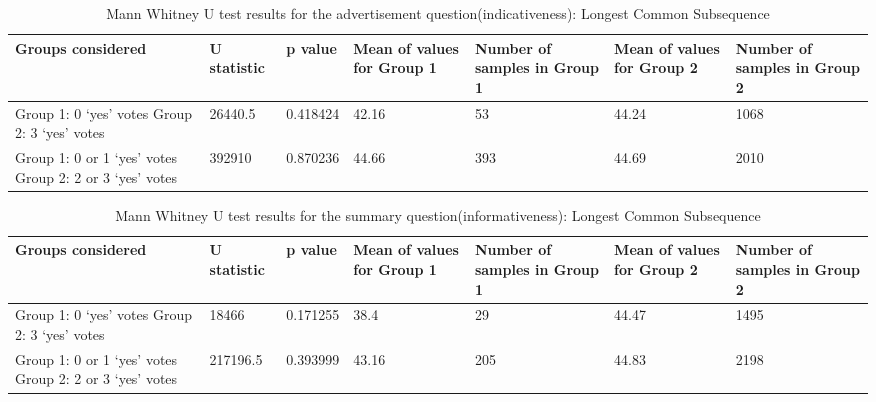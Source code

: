 \begin{table}[!htbp]
\centering
\begin{tabular}{|p{}|p{}|p{}|p{}|p{}|p{}|p{}|}
\hline
\textbf{Groups considered}    & \textbf{U statistic} & \textbf{p value} & \textbf{Mean of values for Group 1} & \textbf{Number of samples in Group 1} & \textbf{Mean of values for Group 2} & \textbf{Number of samples in Group 2}\\ \hline
Group 1: 0 `yes' votes \newline Group 2: 3 `yes' votes &  26440.5  &  0.418424  &  42.16  & 53 &  44.24 &   1068  \\ \hline
Group 1: 0 or 1 `yes' votes \newline Group 2: 2 or 3 `yes' votes  &  392910     & 0.870236 &  44.66  & 393 & 44.69 & 2010 \\ \hline
\end{tabular}
\caption{Mann Whitney U test results for the advertisement question(indicativeness): Longest Common Subsequence}
\label{tab:lcscorr1}
\end{table}

\begin{table}[!htbp]
\centering
\begin{tabular}{|p{}|p{}|p{}|p{}|p{}|p{}|p{}|}
\hline
\textbf{Groups considered}    & \textbf{U statistic} & \textbf{p value} & \textbf{Mean of values for Group 1} & \textbf{Number of samples in Group 1} & \textbf{Mean of values for Group 2} & \textbf{Number of samples in Group 2}\\ \hline
Group 1: 0 `yes' votes \newline Group 2: 3 `yes' votes & 18466   & 0.171255 & 38.4 & 29 & 44.47  & 1495 \\ \hline
Group 1: 0 or 1 `yes' votes \newline Group 2: 2 or 3 `yes' votes & 217196.5      &  0.393999    & 43.16    & 205 & 44.83   &  2198\\ \hline
\end{tabular}
\caption{Mann Whitney U test results for the summary question(informativeness): Longest Common Subsequence}
\label{tab:lcscorr2}
\end{table}

